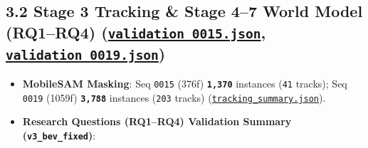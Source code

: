 \documentclass[10.5pt,a4paper]{article}
\begin{document}
\subsection{3.2 Stage 3 Tracking \& Stage 4--7 World Model (RQ1--RQ4) (\href{https://github.com/Heisnotanimposter/Totalcare\_autonomous\_driving\_Yolov5/blob/main/results/v3\_bev\_fixed/world\_outputs/validation\_0015.json}{\texttt{validation\_\allowbreak{}0015.\allowbreak{}json}}, \href{https://github.com/Heisnotanimposter/Totalcare\_autonomous\_driving\_Yolov5/blob/main/results/v3\_bev\_fixed/world\_outputs/validation\_0019.json}{\texttt{validation\_\allowbreak{}0019.\allowbreak{}json}})}

\begin{itemize}[leftmargin=1.5em,itemsep=2pt]
\item \textbf{MobileSAM Masking}: Seq \texttt{0015} (376f) \textbf{\texttt{1,\allowbreak{}370}} instances (\texttt{41} tracks); Seq \texttt{0019} (1059f) \textbf{\texttt{3,\allowbreak{}788}} instances (\texttt{203} tracks) (\href{https://github.com/Heisnotanimposter/Totalcare\_autonomous\_driving\_Yolov5/blob/main/results/v2\_improved/outputs/tracking\_summary.json}{\texttt{tracking\_\allowbreak{}summary.\allowbreak{}json}}).
\item \textbf{Research Questions (RQ1--RQ4) Validation Summary (\texttt{v3\_\allowbreak{}bev\_\allowbreak{}fixed})}:
\end{itemize}
\end{document}
